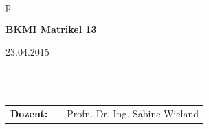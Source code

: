 \begin{center}
\begin{tabular}{p{\textwidth}}
\begin{center}
\large{\textbf{BKMI Matrikel 13}} \\
\small{}
\end{center}

\begin{center}
\large{23.04.2015}
\end{center}

\\

\\

\begin{center}
\begin{tabular}{lll}
\textbf{Dozent:} & & Profn. Dr.-Ing. Sabine Wieland\\
\end{tabular}
\end{center}

\end{tabular}
\end{center}